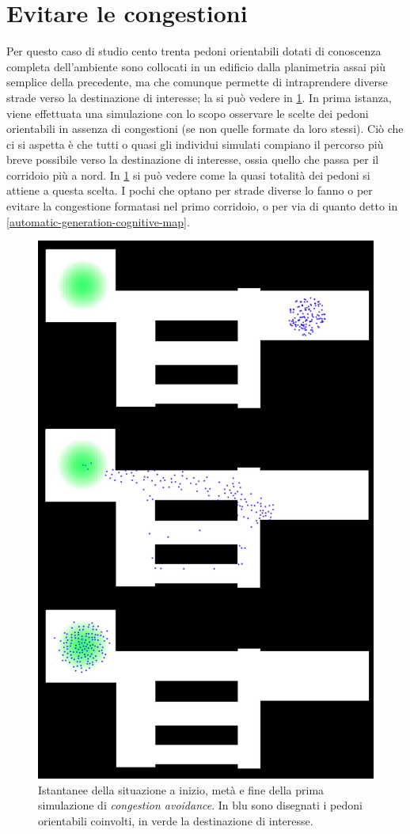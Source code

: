 \documentclass[12pt,a4paper,openright,oneside]{book}
\begin{document}
\section{Evitare le congestioni}
\label{congestion-avoidance-case-study}
Per questo caso di studio cento trenta pedoni orientabili dotati di conoscenza completa dell'ambiente sono collocati in un edificio dalla planimetria assai più semplice della precedente, ma che comunque permette di intraprendere diverse strade verso la destinazione di interesse; la si può vedere in \cref{fig:congestion-avoidance-1}. In prima istanza, viene effettuata una simulazione con lo scopo osservare le scelte dei pedoni orientabili in assenza di congestioni (se non quelle formate da loro stessi). Ciò che ci si aspetta è che tutti o quasi gli individui simulati compiano il percorso più breve possibile verso la destinazione di interesse, ossia quello che passa per il corridoio più a nord. In \cref{fig:congestion-avoidance-1} si può vedere come la quasi totalità dei pedoni si attiene a questa scelta. I pochi che optano per strade diverse lo fanno o per evitare la congestione formatasi nel primo corridoio, o per via di quanto detto in \cref{automatic-generation-cognitive-map}. 
\begin{figure}
	\centering
	\includegraphics[width=0.5\linewidth]{figures/congestion-avoidance-1.png}
	\caption{Istantanee della situazione a inizio, metà e fine della prima simulazione di \emph{congestion avoidance}. In blu sono disegnati i pedoni orientabili coinvolti, in verde la destinazione di interesse.}
	\label{fig:congestion-avoidance-1}
\end{figure}
\end{document}
